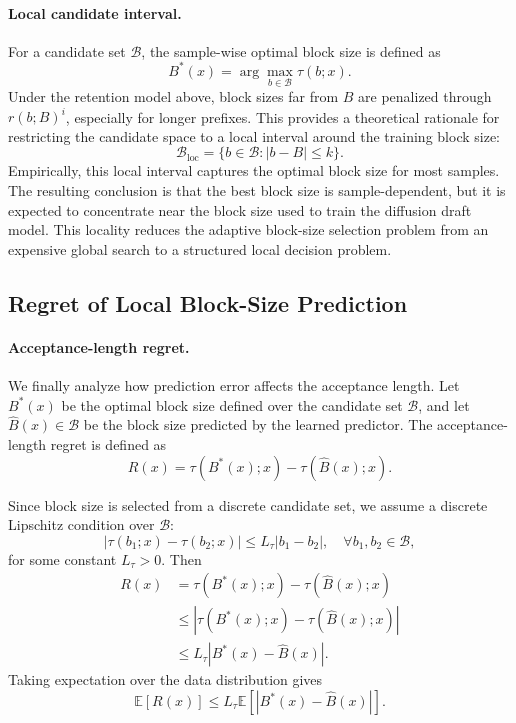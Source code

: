 \documentclass{llmxive}
\begin{document}
\paragraph{Local candidate interval.}
For a candidate set $\mathcal{B}$, the sample-wise optimal block size is defined as
\begin{equation}
B^*(x)
=
\arg\max_{b\in\mathcal{B}}
\tau(b;x).
\end{equation}
Under the retention model above, block sizes far from $B$ are penalized through $r(b;B)^i$, especially for longer prefixes. This provides a theoretical rationale for restricting the candidate space to a local interval around the training block size:
\begin{equation}
\mathcal{B}_{\mathrm{loc}}
=
\{b\in\mathcal{B}: |b-B|\le k\}.
\end{equation}
Empirically, this local interval captures the optimal block size for most samples. The resulting conclusion is that the best block size is sample-dependent, but it is expected to concentrate near the block size used to train the diffusion draft model. This locality reduces the adaptive block-size selection problem from an expensive global search to a structured local decision problem.

\subsection{Regret of Local Block-Size Prediction}

\paragraph{Acceptance-length regret.}
We finally analyze how prediction error affects the acceptance length. Let $B^*(x)$ be the optimal block size defined over the candidate set $\mathcal{B}$, and let $\hat{B}(x)\in\mathcal{B}$ be the block size predicted by the learned predictor. The acceptance-length regret is defined as
\begin{equation}
R(x)
=
\tau(B^*(x);x)
-
\tau(\hat{B}(x);x).
\end{equation}

Since block size is selected from a discrete candidate set, we assume a discrete Lipschitz condition over $\mathcal{B}$:
\begin{equation}
|\tau(b_1;x)-\tau(b_2;x)|
\le
L_\tau |b_1-b_2|,
\quad
\forall b_1,b_2\in\mathcal{B},
\end{equation}
for some constant $L_\tau>0$. Then
\begin{equation}
\begin{aligned}
R(x)
&=
\tau(B^*(x);x)
-
\tau(\hat{B}(x);x) \\
&\le
\left|
\tau(B^*(x);x)
-
\tau(\hat{B}(x);x)
\right| \\
&\le
L_\tau
|B^*(x)-\hat{B}(x)|.
\end{aligned}
\end{equation}
Taking expectation over the data distribution gives
\begin{equation}
\mathbb{E}[R(x)]
\le
L_\tau
\mathbb{E}
\left[
|B^*(x)-\hat{B}(x)|
\right].
\end{equation}
\end{document}
